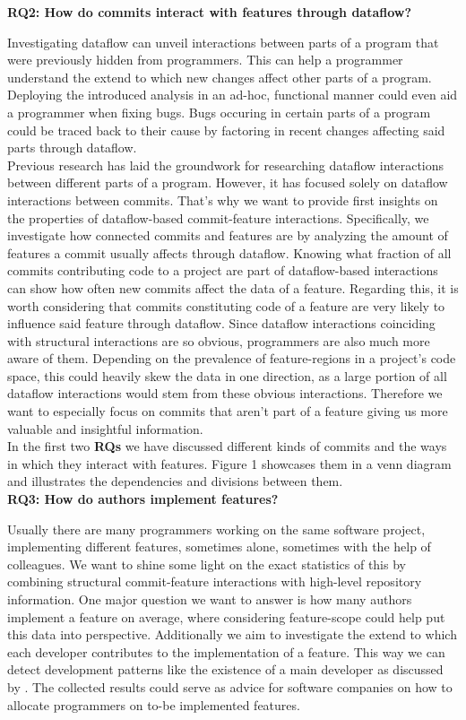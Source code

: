 \textbf{RQ2: How do commits interact with features through dataflow?}

Investigating dataflow can unveil interactions between parts of a program that were previously hidden from programmers.
This can help a programmer understand the extend to which new changes affect other parts of a program.
Deploying the introduced analysis in an ad-hoc, functional manner could even aid a programmer when fixing bugs.
Bugs occuring in certain parts of a program could be traced back to their cause by factoring in recent changes affecting said parts through dataflow. \\
Previous research has laid the groundwork for researching dataflow interactions between different parts of a program.
However, it has focused solely on dataflow interactions between commits.
That's why we want to provide first insights on the properties of dataflow-based commit-feature interactions.
Specifically, we investigate how connected commits and features are by analyzing the amount of features a commit usually affects through dataflow.
Knowing what fraction of all commits contributing code to a project are part of dataflow-based interactions can show how often new commits affect the data of a feature. 
Regarding this, it is worth considering that commits constituting code of a feature are very likely to influence said feature through dataflow.
Since dataflow interactions coinciding with structural interactions are so obvious, programmers are also much more aware of them. 
Depending on the prevalence of feature-regions in a project's code space, this could heavily skew the data in one direction, as a large portion of all dataflow interactions would stem from these obvious interactions. 
Therefore we want to especially focus on commits that aren't part of a feature giving us more valuable and insightful information. \\

In the first two \textbf{RQs} we have discussed different kinds of commits and the ways in which they interact with features. 
Figure 1 showcases them in a venn diagram and illustrates the dependencies and divisions between them. \\

\textbf{RQ3: How do authors implement features?}

Usually there are many programmers working on the same software project, implementing different features, sometimes alone, sometimes with the help of colleagues.
We want to shine some light on the exact statistics of this by combining structural commit-feature interactions with high-level repository information.
One major question we want to answer is how many authors implement a feature on average, where considering feature-scope could help put this data into perspective.
Additionally we aim to investigate the extend to which each developer contributes to the implementation of a feature. 
This way we can detect development patterns like the existence of a main developer as discussed by \citet{sattler2023seal}. 
The collected results could serve as advice for software companies on how to allocate programmers on to-be implemented features. 


